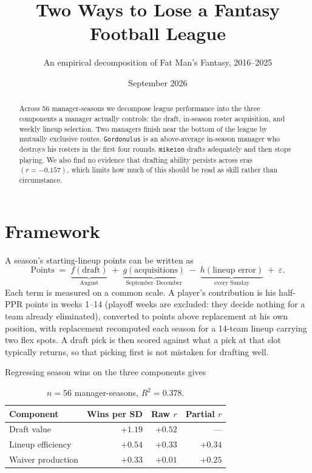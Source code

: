 \documentclass[11pt]{article}
\title{\vspace{-2.5em}Two Ways to Lose a Fantasy Football League}
\author{An empirical decomposition of Fat Man's Fantasy, 2016--2025}
\date{September 2026}
\begin{document}
\maketitle
\vspace{-1.5em}

\begin{abstract}
\noindent Across 56 manager-seasons we decompose league performance into the
three components a manager actually controls: the draft, in-season roster
acquisition, and weekly lineup selection. Two managers finish near the bottom of
the league by mutually exclusive routes. \texttt{Gordonulus} is an above-average
in-season manager who destroys his rosters in the first four rounds.
\texttt{mikeion} drafts adequately and then stops playing. We also find no
evidence that drafting ability persists across eras $(r = -0.157)$, which limits
how much of this should be read as skill rather than circumstance.
\end{abstract}

\section{Framework}

A season's starting-lineup points can be written as
\[
  \text{Points} \;=\; \underbrace{f(\text{draft})}_{\text{August}}
  \;+\; \underbrace{g(\text{acquisitions})}_{\text{September--December}}
  \;-\; \underbrace{h(\text{lineup error})}_{\text{every Sunday}} \;+\; \varepsilon .
\]
Each term is measured on a common scale. A player's contribution is his half-PPR
points in weeks 1--14 (playoff weeks are excluded: they decide nothing for a team
already eliminated), converted to points above replacement at his own position,
with replacement recomputed each season for a 14-team lineup carrying two flex
spots. A draft pick is then scored against what a pick at that slot typically
returns, so that picking first is not mistaken for drafting well.

Regressing season wins on the three components gives

\begin{table}[h]
\centering
\small
\begin{tabular}{lrrr}
\toprule
Component & Wins per SD & Raw $r$ & Partial $r$ \\
\midrule
Draft value            & $+1.19$ & $+0.52$ & --- \\
Lineup efficiency      & $+0.54$ & $+0.33$ & $+0.34$ \\
Waiver production      & $+0.33$ & $+0.01$ & $+0.25$ \\
\bottomrule
\end{tabular}
\caption{$n = 56$ manager-seasons, $R^2 = 0.378$.}
\end{table}
\end{document}
